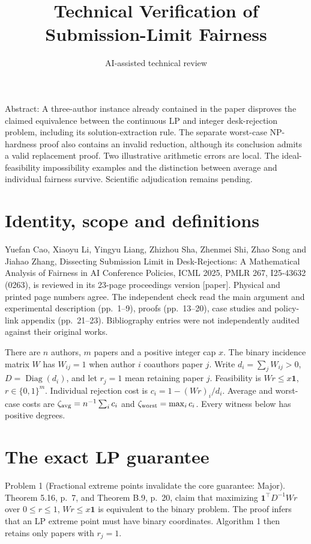 \documentclass[10pt]{article}
\title{Technical Verification of Submission-Limit Fairness}
\author{AI-assisted technical review}
\date{}
\begin{document}
\maketitle
Abstract: A three-author instance already contained in the paper disproves the claimed equivalence between the continuous LP and integer desk-rejection problem, including its solution-extraction rule. The separate worst-case NP-hardness proof also contains an invalid reduction, although its conclusion admits a valid replacement proof. Two illustrative arithmetic errors are local. The ideal-feasibility impossibility examples and the distinction between average and individual fairness survive. Scientific adjudication remains pending.\par
\section*{Identity, scope and definitions}
Yuefan Cao, Xiaoyu Li, Yingyu Liang, Zhizhou Sha, Zhenmei Shi, Zhao Song and Jiahao Zhang, Dissecting Submission Limit in Desk-Rejections: A Mathematical Analysis of Fairness in AI Conference Policies, ICML 2025, PMLR 267, I25-43632 (0263), is reviewed in its 23-page proceedings version [paper]. Physical and printed page numbers agree. The independent check read the main argument and experimental description (pp. 1–9), proofs (pp. 13–20), case studies and policy-link appendix (pp. 21–23). Bibliography entries were not independently audited against their original works.\par
There are \(n\) authors, \(m\) papers and a positive integer cap \(x\). The binary incidence matrix \(W\) has \(W_{ij}=1\) when author \(i\) coauthors paper \(j\). Write \(d_i=\sum_jW_{ij}>0\), \(D=\operatorname{Diag}(d_i)\), and let \(r_j=1\) mean retaining paper \(j\). Feasibility is \(Wr\le x\mathbf1\), \(r\in\{0,1\}^m\). Individual rejection cost is \(c_i=1-(Wr)_i/d_i\). Average and worst-case costs are \(\zeta_{\rm avg}=n^{-1}\sum_i c_i\) and \(\zeta_{\rm worst}=\max_i c_i\). Every witness below has positive degrees.\par
\section*{The exact LP guarantee}
Problem 1 (Fractional extreme points invalidate the core guarantee: Major).  Theorem 5.16, p. 7, and Theorem B.9, p. 20, claim that maximizing \(\mathbf1^\top D^{-1}Wr\) over \(0\le r\le1\), \(Wr\le x\mathbf1\) is equivalent to the binary problem. The proof infers that an LP extreme point must have binary coordinates. Algorithm 1 then retains only papers with \(r_j=1\).\par
\end{document}
